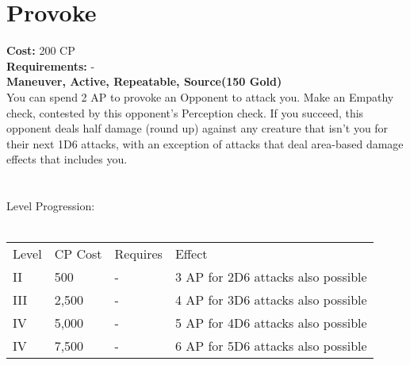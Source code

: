 \section{Provoke}
\textbf{Cost:} 200 CP\\
\textbf{Requirements:} -\\
\textbf{Maneuver, Active, Repeatable, Source(150 Gold)}\\
You can spend 2 AP to provoke an Opponent to attack you. Make an Empathy check, contested by this opponent's Perception check. If you succeed, this opponent deals half damage (round up) against any creature that isn't you for their next 1D6 attacks, with an exception of attacks that deal area-based damage effects that includes you.\\
\\
\\
Level Progression:\\
\\
\begin{tabular}{l | l | l | l}
	Level & CP Cost & Requires & Effect\\
	II & 500 & - & 3 AP for 2D6 attacks also possible\\
	III & 2,500 & - & 4 AP for 3D6 attacks also possible\\
	IV & 5,000 & - & 5 AP for 4D6 attacks also possible\\
	IV & 7,500 & - & 6 AP for 5D6 attacks also possible\\
\end{tabular}